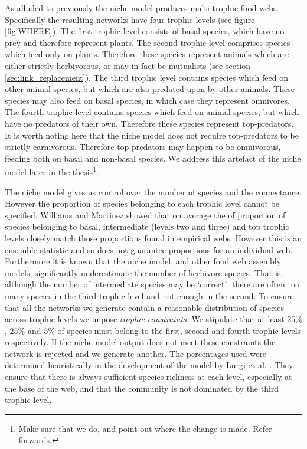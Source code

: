 As alluded to previously the niche model produces multi-trophic food webs. Specifically the resulting networks have four trophic levels (see figure \ref{fig:WHERE}). The first trophic level consists of basal species, which have no prey and therefore represent plants. The second trophic level comprises species which feed only on plants. Therefore these species represent animals which are either strictly herbivorous, or may in fact be mutualists (see section \ref{sec:link_replacement}). The third trophic level contains species which feed on other animal species, but which are also predated upon by other animals. These species may also feed on basal species, in which case they represent omnivores. The fourth trophic level contains species which feed on animal species, but which have no predators of their own. Therefore these species represent top-predators. It is worth noting here that the niche model does not require top-predators to be strictly carnivorous. Therefore top-predators may happen to be omnivorous, feeding both on basal and non-basal species. We address this artefact of the niche model later in the thesis\footnote{Make sure that we do, and point out where the change is made. Refer forwards.}.

The niche model gives us control over the number of species and the connectance. However the proportion of species belonging to each trophic level cannot be specified. Williams and Martinez \cite{williams2000simple} showed that on average the of proportion of species belonging to basal, intermediate (levels two and three) and top trophic levels closely match those proportions found in empirical webs. However this is an ensemble statistic and so does not guarantee proportions for an individual web. Furthermore it is known that the niche model, and other food web assembly models, significantly underestimate the number of herbivore species\cite{williams2008success}. That is, although the number of intermediate species may be `correct', there are often too many species in the third trophic level and not enough in the second. To ensure that all the networks we generate contain a reasonable distribution of species across trophic levels we impose \emph{trophic constraints}. We stipulate that at least $25\%$, $25\%$ and $5\%$ of species must belong to the first, second and fourth trophic levels respectively. If the niche model output does not meet these constraints the network is rejected and we generate another. The percentages used were determined heuristically in the development of the model by Lurgi et al. \cite{lurgi2015effects}. They ensure that there is always sufficient species richness at each level, especially at the base of the web, and that the community is not dominated by the third trophic level. 

